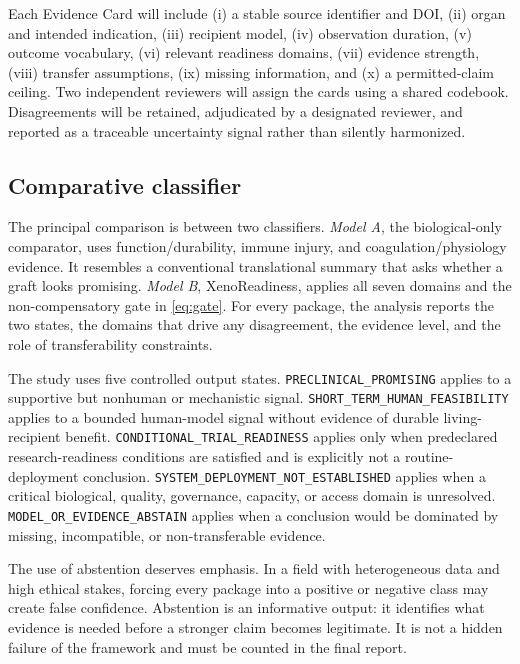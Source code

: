 \documentclass[conference]{IEEEtran}
\newcommand{\state}[1]{\texttt{#1}}
\begin{document}
Each Evidence Card will include (i) a stable source identifier and DOI, (ii) organ and intended indication, (iii) recipient model, (iv) observation duration, (v) outcome vocabulary, (vi) relevant readiness domains, (vii) evidence strength, (viii) transfer assumptions, (ix) missing information, and (x) a permitted-claim ceiling. Two independent reviewers will assign the cards using a shared codebook. Disagreements will be retained, adjudicated by a designated reviewer, and reported as a traceable uncertainty signal rather than silently harmonized.

\subsection{Comparative classifier}

The principal comparison is between two classifiers. \emph{Model A}, the biological-only comparator, uses function/durability, immune injury, and coagulation/physiology evidence. It resembles a conventional translational summary that asks whether a graft looks promising. \emph{Model B}, XenoReadiness, applies all seven domains and the non-compensatory gate in \eqref{eq:gate}. For every package, the analysis reports the two states, the domains that drive any disagreement, the evidence level, and the role of transferability constraints.

The study uses five controlled output states. \state{PRECLINICAL\_PROMISING} applies to a supportive but nonhuman or mechanistic signal. \state{SHORT\_TERM\_HUMAN\_FEASIBILITY} applies to a bounded human-model signal without evidence of durable living-recipient benefit. \state{CONDITIONAL\_TRIAL\_READINESS} applies only when predeclared research-readiness conditions are satisfied and is explicitly not a routine-deployment conclusion. \state{SYSTEM\_DEPLOYMENT\_NOT\_ESTABLISHED} applies when a critical biological, quality, governance, capacity, or access domain is unresolved. \state{MODEL\_OR\_EVIDENCE\_ABSTAIN} applies when a conclusion would be dominated by missing, incompatible, or non-transferable evidence.

The use of abstention deserves emphasis. In a field with heterogeneous data and high ethical stakes, forcing every package into a positive or negative class may create false confidence. Abstention is an informative output: it identifies what evidence is needed before a stronger claim becomes legitimate. It is not a hidden failure of the framework and must be counted in the final report.
\end{document}
